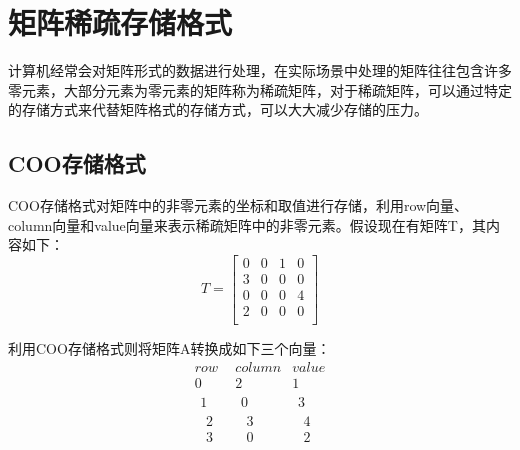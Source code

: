 \section{矩阵稀疏存储格式}

计算机经常会对矩阵形式的数据进行处理，在实际场景中处理的矩阵往往包含许多零元素，大部分元素为零元素的矩阵称为稀疏矩阵，对于稀疏矩阵，可以通过特定的存储方式来代替矩阵格式的存储方式，可以大大减少存储的压力。

\subsection{COO存储格式}

COO存储格式对矩阵中的非零元素的坐标和取值进行存储，利用row向量、column向量和value向量来表示稀疏矩阵中的非零元素。假设现在有矩阵T，其内容如下：
\[T=\left[ \begin{matrix}
	0&		0&		1&		0\\
	3&		0&		0&		0\\
	0&		0&		0&		4\\
	2&		0&		0&		0\\
\end{matrix} \right] \]

利用COO存储格式则将矩阵A转换成如下三个向量：
\[\begin{matrix}
	row&		column&		value\\
	0&		2&		1\\
	\begin{array}{c}
	1\\
	\begin{array}{c}
	2\\
	3\\
\end{array}\\
\end{array}&		\begin{array}{c}
	0\\
	\begin{array}{c}
	3\\
	0\\
\end{array}\\
\end{array}&		\begin{array}{c}
	3\\
	\begin{array}{c}
	4\\
	2\\
\end{array}\\
\end{array}\\
\end{matrix}\]

